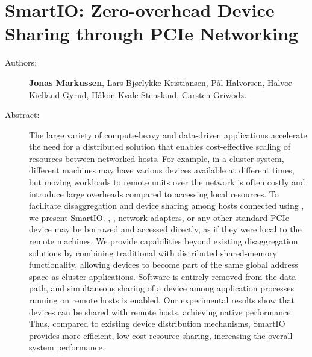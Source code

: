 \chapter{SmartIO: Zero-overhead Device Sharing through PCIe Networking}
\label{paper:tocs}
\paperthumb

\begin{description}
	\item[Authors:]
		\textbf{Jonas Markussen}, Lars Bj{\o}rlykke Kristiansen, P{\aa}l Halvorsen,
		Halvor Kielland-Gyrud, H{\aa}kon Kvale Stensland, Carsten Griwodz.

	\item[Abstract:]
		The large variety of compute-heavy and data-driven applications accelerate the need for a distributed
		 solution that enables cost-effective scaling of resources between networked hosts. For example,
		in a cluster system, different machines may have various devices available at different times, 
		but moving workloads to remote units over the network is often costly and introduce 
		large overheads compared to accessing local resources. 
		To facilitate  \gls{disaggregation} and device sharing among hosts connected using  
		, we present SmartIO. , , network adapters, 
		or any other standard PCIe device may be borrowed and accessed directly, as if they were local to the remote machines.
		We provide capabilities beyond existing \gls{disaggregation} solutions 
		by combining traditional  with distributed shared-memory functionality, allowing devices 
		to become part of the same global address space as cluster applications.
		Software is entirely removed from the data path, and simultaneous sharing of a device among 
		application processes running on remote hosts is enabled.
		Our experimental results show that  devices can be shared with remote hosts,
		achieving native  performance.
		Thus, compared to existing device distribution mechanisms, SmartIO provides more efficient, low-cost resource
		sharing, increasing the overall system performance.


\end{description}
